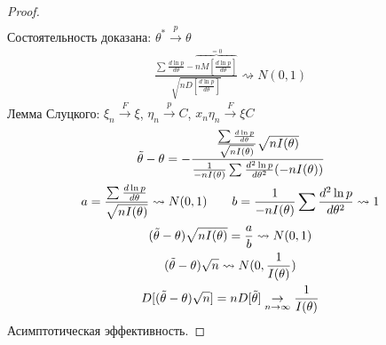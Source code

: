 \documentclass{article}
\begin{document}
\begin{proof}
\begin{gather*}
  \end{gather*}
  Состоятельность доказана: $\theta^{*}\overset{p}{\to}\theta$
  \begin{gather*}
    \frac{\sum_{}^{}\frac{d\ln p}{d\theta}-\overbrace{nM[\frac{d \ln p}{d \theta}]}^{=0}}{\sqrt{nD[\frac{d\ln p}{d\theta}]}} \rightsquigarrow N(0,1)
  \end{gather*}
  Лемма Слуцкого: $\xi_n \overset{F}{\to}\xi$, $\eta_n \overset{p}{\to} C$, $x_n\eta_n \overset{F}{\to}\xi C$
  \begin{gather*}
    \tilde{\theta}-\theta=-\cfrac{\frac{\sum_{}^{}\frac{d\ln p}{d\theta}}{\sqrt{nI(\theta)}}\sqrt{nI(\theta)}}{\frac{1}{-nI(\theta)}\sum_{}^{}\frac{d^{2} \ln p}{d \theta^{2}}(-nI(\theta))} \\ 
    a = \frac{\sum_{}^{}\frac{d\ln p}{d\theta}}{\sqrt{nI(\theta)}}\rightsquigarrow N(0,1) \qquad b =\frac{1}{-nI(\theta)}\sum_{}^{}\frac{d^{2} \ln p}{d \theta^{2}} \rightsquigarrow1 \\ 
    (\tilde{\theta}-\theta)\sqrt{nI(\theta)}=\frac{a}{b} \rightsquigarrow N(0,1) \\ 
    (\tilde{\theta}-\theta)\sqrt{n} \rightsquigarrow N(0, \frac{1}{I(\theta)}) \\ 
    D[(\tilde{\theta}-\theta)\sqrt{n}]=nD[\tilde{\theta}] \underset{n\to \infty}{\to} \frac{1}{I(\theta)}
  \end{gather*}
  Асимптотическая эффективность.
\end{proof}

\end{document}
